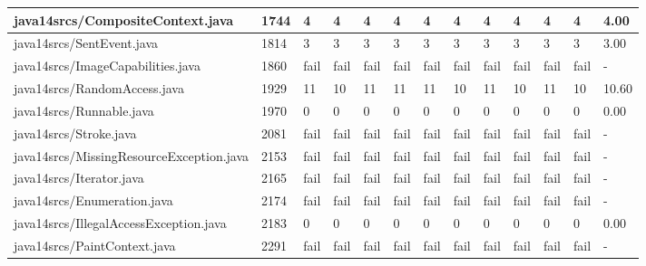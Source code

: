 \begin{tabular}{|l|l|l|l|l|l|l|l|l|l|l|l|l|}
\hline
java14srcs/CompositeContext.java                   & 1744        & 4         & 4         & 4         & 4         & 4         & 4         & 4         & 4         & 4         & 4         & 4.00      \\
\hline
java14srcs/SentEvent.java                          & 1814        & 3         & 3         & 3         & 3         & 3         & 3         & 3         & 3         & 3         & 3         & 3.00      \\
\hline
java14srcs/ImageCapabilities.java                  & 1860        & fail      & fail      & fail      & fail      & fail      & fail      & fail      & fail      & fail      & fail      & -         \\
\hline
java14srcs/RandomAccess.java                       & 1929        & 11        & 10        & 11        & 11        & 11        & 10        & 11        & 10        & 11        & 10        & 10.60     \\
\hline
java14srcs/Runnable.java                           & 1970        & 0         & 0         & 0         & 0         & 0         & 0         & 0         & 0         & 0         & 0         & 0.00      \\
\hline
java14srcs/Stroke.java                             & 2081        & fail      & fail      & fail      & fail      & fail      & fail      & fail      & fail      & fail      & fail      & -         \\
\hline
java14srcs/MissingResourceException.java           & 2153        & fail      & fail      & fail      & fail      & fail      & fail      & fail      & fail      & fail      & fail      & -         \\
\hline
java14srcs/Iterator.java                           & 2165        & fail      & fail      & fail      & fail      & fail      & fail      & fail      & fail      & fail      & fail      & -         \\
\hline
java14srcs/Enumeration.java                        & 2174        & fail      & fail      & fail      & fail      & fail      & fail      & fail      & fail      & fail      & fail      & -         \\
\hline
java14srcs/IllegalAccessException.java             & 2183        & 0         & 0         & 0         & 0         & 0         & 0         & 0         & 0         & 0         & 0         & 0.00      \\
\hline
java14srcs/PaintContext.java                       & 2291        & fail      & fail      & fail      & fail      & fail      & fail      & fail      & fail      & fail      & fail      & -         \\

\end{tabular}
